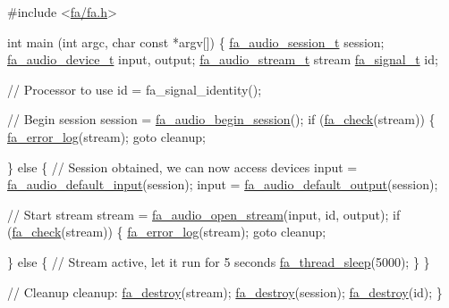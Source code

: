 \begin{DoxyCode}
\textcolor{preprocessor}{#include <\hyperlink{fa_2fa_8h}{fa/fa.h}>}

\textcolor{keywordtype}{int} main (\textcolor{keywordtype}{int} argc, \textcolor{keywordtype}{char} \textcolor{keyword}{const} *argv[])
\{
    \hyperlink{group___fa_audio_session_ga62ee22268c23f1b18447141feccc01e0}{fa\_audio\_session\_t}     session;
    \hyperlink{group___fa_audio_device_ga03de89ee66c6465f8cedd3a0286598f4}{fa\_audio\_device\_t}      input, output;
    \hyperlink{group___fa_audio_stream_ga78fbee3026130ce00d8e00a4e73a84c3}{fa\_audio\_stream\_t}      stream
    \hyperlink{group___fa_signal_gac5c72f160cd6e93a6783551627b166e5}{fa\_signal\_t}            id;

    \textcolor{comment}{// Processor to use}
    \textcolor{keywordtype}{id} = fa\_signal\_identity();

    \textcolor{comment}{// Begin session}
    session = \hyperlink{group___fa_audio_session_ga0022e6e72ee2f2c4c04a6165847a50dd}{fa\_audio\_begin\_session}();
    \textcolor{keywordflow}{if} (\hyperlink{group___fa_gaec61e23c174faf5e5244ae876d264eb5}{fa\_check}(stream)) \{
        \hyperlink{group___fa_error_ga466e0539bedb29f68527448ed9ba11bf}{fa\_error\_log}(stream);
        \textcolor{keywordflow}{goto} cleanup;

    \} \textcolor{keywordflow}{else} \{
        \textcolor{comment}{// Session obtained, we can now access devices}
        input  = \hyperlink{group___fa_audio_device_ga690374b4ffcee314cb4cdad6309ef817}{fa\_audio\_default\_input}(session);
        input  = \hyperlink{group___fa_audio_device_ga364583565c9405e541ae52e41efa38e7}{fa\_audio\_default\_output}(session);

        \textcolor{comment}{// Start stream}
        stream = \hyperlink{group___fa_audio_stream_ga912f03969d6207dd40a2746e62888adb}{fa\_audio\_open\_stream}(input, \textcolor{keywordtype}{id}, output);
        \textcolor{keywordflow}{if} (\hyperlink{group___fa_gaec61e23c174faf5e5244ae876d264eb5}{fa\_check}(stream)) \{
            \hyperlink{group___fa_error_ga466e0539bedb29f68527448ed9ba11bf}{fa\_error\_log}(stream);
            \textcolor{keywordflow}{goto} cleanup;

        \} \textcolor{keywordflow}{else} \{
            \textcolor{comment}{// Stream active, let it run for 5 seconds}
            \hyperlink{group___fa_thread_ga6a6c70317be48603d0316bdb93914f5f}{fa\_thread\_sleep}(5000);
        \}
    \}

    \textcolor{comment}{// Cleanup}
cleanup:
    \hyperlink{group___fa_ga6fd6818b190b9e41a3b5f07e78638539}{fa\_destroy}(stream);
    \hyperlink{group___fa_ga6fd6818b190b9e41a3b5f07e78638539}{fa\_destroy}(session);
    \hyperlink{group___fa_ga6fd6818b190b9e41a3b5f07e78638539}{fa\_destroy}(\textcolor{keywordtype}{id});
\}
\end{DoxyCode}
